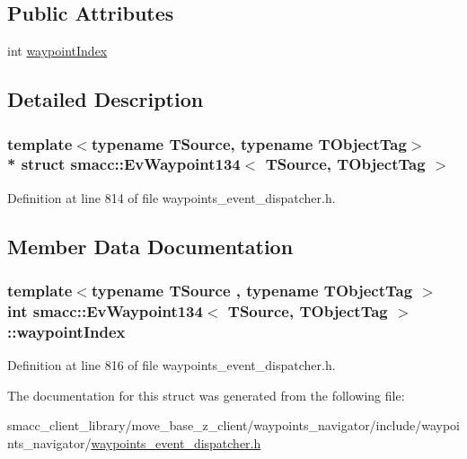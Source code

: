 \subsection*{Public Attributes}
\begin{DoxyCompactItemize}
\item 
int \hyperlink{structsmacc_1_1EvWaypoint134_ad9b270b94470e32679edc1d9c733c4a0}{waypoint\+Index}
\end{DoxyCompactItemize}


\subsection{Detailed Description}
\subsubsection*{template$<$typename T\+Source, typename T\+Object\+Tag$>$\\*
struct smacc\+::\+Ev\+Waypoint134$<$ T\+Source, T\+Object\+Tag $>$}



Definition at line 814 of file waypoints\+\_\+event\+\_\+dispatcher.\+h.



\subsection{Member Data Documentation}
\subsubsection[{\texorpdfstring{waypoint\+Index}{waypointIndex}}]{\setlength{\rightskip}{0pt plus 5cm}template$<$typename T\+Source , typename T\+Object\+Tag $>$ int {\bf smacc\+::\+Ev\+Waypoint134}$<$ T\+Source, T\+Object\+Tag $>$\+::waypoint\+Index}\hypertarget{structsmacc_1_1EvWaypoint134_ad9b270b94470e32679edc1d9c733c4a0}{}\label{structsmacc_1_1EvWaypoint134_ad9b270b94470e32679edc1d9c733c4a0}


Definition at line 816 of file waypoints\+\_\+event\+\_\+dispatcher.\+h.



The documentation for this struct was generated from the following file\+:\begin{DoxyCompactItemize}
\item 
smacc\+\_\+client\+\_\+library/move\+\_\+base\+\_\+z\+\_\+client/waypoints\+\_\+navigator/include/waypoints\+\_\+navigator/\hyperlink{waypoints__event__dispatcher_8h}{waypoints\+\_\+event\+\_\+dispatcher.\+h}\end{DoxyCompactItemize}
